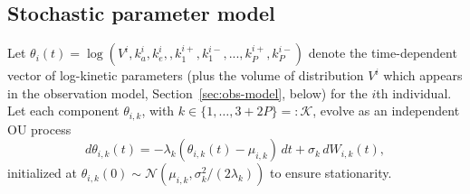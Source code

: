 \subsection{Stochastic parameter model}
\label{sec:param-model}

Let $\theta_i(t)=\log ( V^i, k^i_a,  k^i_e, , k^{i+}_1,  k^{i-}_1,..., k^{i+}_P, k^{i-}_P)$ denote the time-dependent vector of log-kinetic parameters (plus the volume of distribution $V^i$ which appears in the observation model, Section~\ref{sec:obs-model}, below) for the $i$th individual.
%
Let each component $\theta_{i,k}$, with $k\in\{1,\dots,3+2P\}=:\mathcal{K}$, evolve as an independent OU process
%
\begin{equation}
d\theta_{i,k}(t)=
  -\lambda_{k}\!\left(\theta_{i,k}(t)-\mu_{i,k}\right)\,dt
  +\sigma_{k}\,dW_{i,k}(t),
\label{eq:ou}
\end{equation}
%
initialized at $\theta_{i,k}(0)\sim \mathcal{N}(\mu_{i,k},\sigma_k^2/(2\lambda_k))$ to ensure stationarity.


